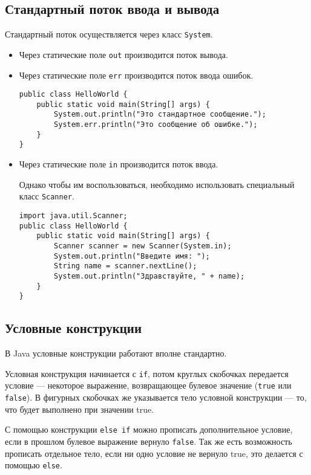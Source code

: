 \subsection{Стандартный поток ввода и вывода}
Стандартный поток осуществляется через класс \texttt{System}.
\begin{itemize}
    \item Через статические поле \texttt{out} производится поток вывода.
    \item Через статические поле \texttt{err} производится поток ввода ошибок.
    \begin{verbatim}
public class HelloWorld {
    public static void main(String[] args) {
        System.out.println("Это стандартное сообщение.");
        System.err.println("Это сообщение об ошибке.");
    }
}
    \end{verbatim}
    \vspace{0.4cm}

    \item Через статические поле \texttt{in} производится поток ввода.

    Однако чтобы им воспользоваться, необходимо использовать специальный класс \texttt{Scanner}.
    \begin{verbatim}
import java.util.Scanner;
public class HelloWorld {
    public static void main(String[] args) {
        Scanner scanner = new Scanner(System.in);
        System.out.println("Введите имя: ");
        String name = scanner.nextLine();
        System.out.println("Здравствуйте, " + name);
    }
}
    \end{verbatim}
    \vspace{0.4cm}
\end{itemize}



\subsection{Условные конструкции}
В Java условные конструкции работают вполне стандартно.\par
Условная конструкция начинается с \texttt{if}, потом круглых скобочках передается условие — некоторое выражение, возвращающее булевое значение (\texttt{true} или \texttt{false}).\newline
В фигурных скобочках же указывается тело условной конструкции — то, что будет выполнено при значении true.\par
С помощью конструкции \texttt{else if} можно прописать дополнительное условие, если в прошлом булевое выражение вернуло \texttt{false}.\newline
Так же есть возможность прописать отдельное тело, если ни одно условие не вернуло true, это делается с помощью \texttt{else}.

